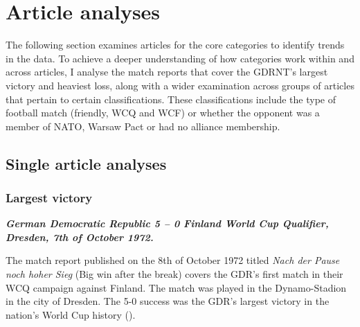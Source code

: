 \section*{Article analyses}

The following section examines articles for the core categories to identify trends in the data. To achieve a deeper understanding of how categories work within and across articles, I analyse the match reports that cover the GDRNT’s largest victory and heaviest loss, along with a wider examination across groups of articles that pertain to certain classifications. These classifications include the type of football match (friendly, WCQ and WCF) or whether the opponent was a member of NATO, Warsaw Pact or had no alliance membership. 

\subsection*{Single article analyses}

\subsubsection*{Largest victory}

\textbf{\textit{German Democratic Republic 5 – 0 Finland
\newline World Cup Qualifier, Dresden, 7th of October 1972.}}

The match report published on the 8th of October 1972 titled \textit{Nach der Pause noch hoher Sieg} (Big win after the break) covers the GDR’s first match in their WCQ campaign against Finland. The match was played in the Dynamo-Stadion in the city of Dresden. The 5-0 success was the GDR’s largest victory in the nation’s World Cup history (\cite{dähn2013}).

